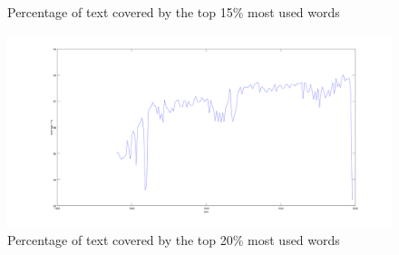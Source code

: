\begin{figure}[h!]
\begin{minipage}[b]{0.48\linewidth}
        \caption{Percentage of text covered by the top 15\% most used words}
        \label{coverage_15_percent}
    \end{minipage}\hfill
    \begin{minipage}[b]{0.48\linewidth}
        \includegraphics[scale=0.15]{Pictures/statistics/top-k-words-coverage/graph20.png}
        \caption{Percentage of text covered by the top 20\% most used words}
        \label{coverage_20_percent}
    \end{minipage}\hfill
\end{figure}